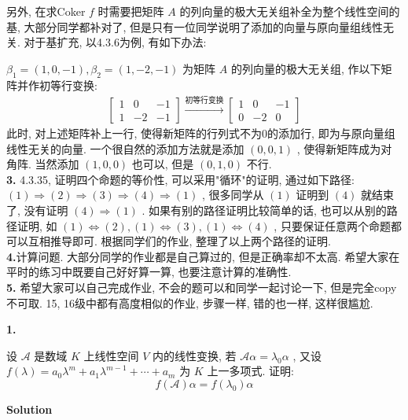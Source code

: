 \documentclass[11pt,a4paper,openany,oneside]{book}
\newcommand\Solution{\noindent\textbf{\textsf{Solution}}\par\medskip}
\begin{document}
另外, 在求Coker $ f $ 时需要把矩阵 $ A $ 的列向量的极大无关组补全为整个线性空间的基, 大部分同学都补对了, 但是只有一位同学说明了添加的向量与原向量组线性无关. 对于基扩充, 以4.3.6为例, 有如下办法:

 $ \beta_1=(1, 0, -1), \beta_2=(1, -2, -1) $ 为矩阵 $ A $ 的列向量的极大无关组, 作以下矩阵并作初等行变换:
\begin{gather*}
\begin{bmatrix}
1  &  0  &  -1 \\
1&  -2 &  -1  
\end{bmatrix} \xrightarrow{初等行变换}
\begin{bmatrix}
1  &  0  &  -1  \\
0  &  -2  &  0
\end{bmatrix}
\end{gather*}
此时, 对上述矩阵补上一行, 使得新矩阵的行列式不为0的添加行, 即为与原向量组线性无关的向量. 一个很自然的添加方法就是添加 $ (0, 0, 1) $ , 使得新矩阵成为对角阵. 当然添加 $ (1,0,0) $ 也可以, 但是 $ (0,1,0) $ 不行. \\

\textbf{3.} 4.3.35, 证明四个命题的等价性, 可以采用"循环"的证明, 通过如下路径: $ (1) \Rightarrow (2) \Rightarrow (3) \Rightarrow (4) \Rightarrow (1) $ , 很多同学从 $ (1) $ 证明到 $ (4) $ 就结束了, 没有证明 $ (4) \Rightarrow (1) $ . 如果有别的路径证明比较简单的话, 也可以从别的路径证明, 如 $ (1) \Leftrightarrow (2),(1) \Leftrightarrow (3), (1) \Leftrightarrow (4) $ , 只要保证任意两个命题都可以互相推导即可. 根据同学们的作业, 整理了以上两个路径的证明.  \\ 

\textbf{4.}计算问题. 大部分同学的作业都是自己算过的, 但是正确率却不太高. 希望大家在平时的练习中既要自己好好算一算, 也要注意计算的准确性. \\

\textbf{5.} 希望大家可以自己完成作业, 不会的题可以和同学一起讨论一下, 但是完全copy不可取. 15, 16级中都有高度相似的作业, 步骤一样, 错的也一样, 这样很尴尬. \\


\begin{myexample}
	\textbf{1.} 

设 $ \mathcal{A} $ 是数域 $ K $ 上线性空间 $ V $ 内的线性变换, 若 $ \mathcal{A}\alpha = \lambda_0\alpha $ , 又设 $ f(\lambda) = a_0\lambda^m + a_1\lambda^{m-1} + \cdots + a_m $ 为 $ K $ 上一多项式. 证明:
 $$  f(\mathcal{A})\alpha = f(\lambda_0)\alpha  $$ 

\end{myexample}
\Solution 
\end{document}
